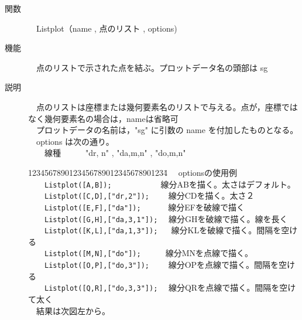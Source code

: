 \documentclass[papersize,a4paper,12pt,uplatex]{jsarticle}
\begin{document}
\begin{description}
\hypertarget{listplot}{}
\item[関数]　Listplot（name , 点のリスト , options)
\item[機能]　点のリストで示された点を結ぶ。プロットデータ名の頭部は sg
\item[説明]　点のリストは座標または幾何要素名のリストで与える。点が，座標ではなく幾何要素名の場合は，nameは省略可 \\
　プロットデータの名前は，"sg" に引数の name を付加したものとなる。\\
　options は次の通り。\\
　　線種　　　"dr, n"  , "da,m,n" , "do,m,n"
\begin{tabbing}
1234567890123456789012345678901234\=\kill
　optionsの使用例\\
　　\verb|Listplot([A,B]);|　　　　　　\>線分ABを描く。太さはデフォルト。\\
　　\verb|Listplot([C,D],["dr,2"]);|　　 \>線分CDを描く。太さ２\\
　　\verb|Listplot([E,F],["da"]);|　　　 \>線分EFを破線で描く\\
　　\verb|Listplot([G,H],["da,3,1"]);| 　\>線分GHを破線で描く。線を長く\\
　　\verb|Listplot([K,L],["da,1,3"]);| 　 \>線分KLを破線で描く。間隔を空ける\\
　　\verb|Listplot([M,N],["do"]);|　　　\>線分MNを点線で描く。\\
　　\verb|Listplot([O,P],["do,3"]);|　　 \>線分OPを点線で描く。間隔を空ける\\
　　\verb|Listplot([Q,R],["do,3,3"]);|　 \>線分QRを点線で描く。間隔を空けて太く\\
　結果は次図左から。
\end{tabbing}
　　


\end{description}
\end{document}
